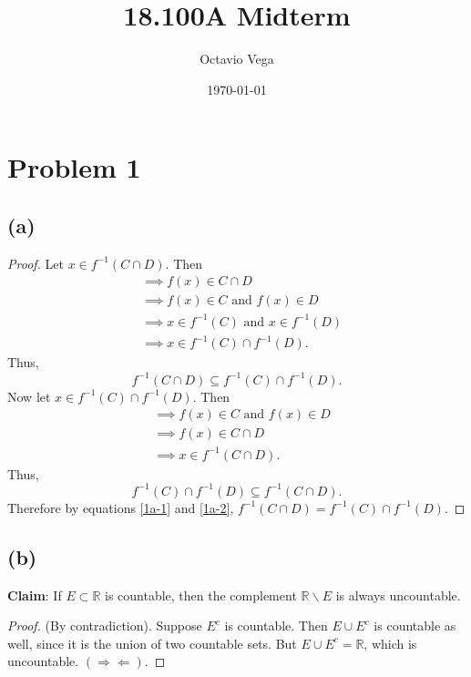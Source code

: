 \documentclass{article}
\title{18.100A Midterm}
\author{Octavio Vega}
\date\today
\newcommand{\R}{\mathbb{R}} %
\begin{document}
\maketitle

\section*{Problem 1}
\subsection*{(a)}
\begin{proof}
Let $x \in f^{-1}(C \cap D)$. Then 
\begin{align}
	&\implies f(x) \in C \cap D \\
	&\implies f(x) \in C \textrm{ and } f(x) \in D \\
	&\implies x \in f^{-1}(C) \textrm{ and } x \in f^{-1}(D) \\
	&\implies x \in f^{-1}(C) \cap f^{-1}(D).
\end{align}
Thus, 
\begin{equation}\label{1a-1}
	f^{-1}(C \cap D) \subseteq f^{-1}(C) \cap f^{-1}(D).
\end{equation}
Now let $x \in f^{-1}(C) \cap f^{-1}(D)$. Then
\begin{align}
	&\implies f(x) \in C \textrm{ and } f(x) \in D \\
	&\implies f(x) \in C \cap D \\
	&\implies x \in f^{-1}(C \cap D).
\end{align}
Thus,
\begin{equation}\label{1a-2}
	 f^{-1}(C) \cap f^{-1}(D) \subseteq f^{-1}(C \cap D).
\end{equation}
Therefore by equations \eqref{1a-1} and \eqref{1a-2}, $f^{-1}(C \cap D) = f^{-1}(C) \cap f^{-1}(D)$.
\end{proof}

\subsection*{(b)}
\textbf{Claim}: If $E \subset \R$ is countable, then the complement $\R\backslash E$ is always uncountable.
\begin{proof}
	(By contradiction). Suppose $E^c$ is countable. Then $E \cup E^c$ is countable as well, since it is the union of two countable sets. But $E \cup E^c = \R$, which is uncountable. $(\Rightarrow\Leftarrow)$.
\end{proof}
\end{document}
